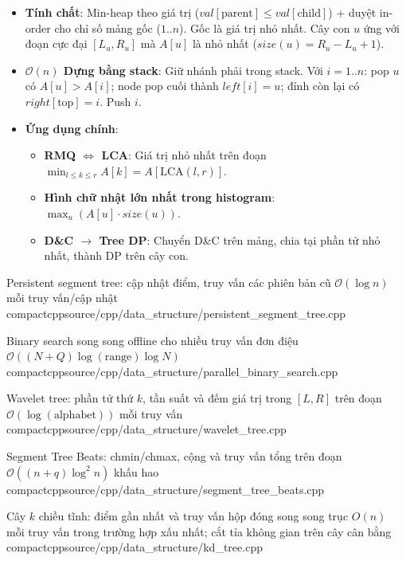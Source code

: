 \begin{itemize}
    \item \textbf{Tính chất}: Min-heap theo giá trị ($val[\text{parent}] \le val[\text{child}]$) + duyệt in-order cho chỉ số mảng gốc ($1..n$). Gốc là giá trị nhỏ nhất. Cây con $u$ ứng với đoạn cực đại $[L_u, R_u]$ mà $A[u]$ là nhỏ nhất ($size(u) = R_u - L_u + 1$).
    \item \textbf{$\mathcal{O}(n)$ Dựng bằng stack}: Giữ nhánh phải trong stack. Với $i = 1..n$: pop $u$ có $A[u] > A[i]$; node pop cuối thành $left[i] = u$; đỉnh còn lại có $right[\text{top}] = i$. Push $i$.
    \item \textbf{Ứng dụng chính}:
    \begin{itemize}
        \item \textbf{RMQ $\iff$ LCA}: Giá trị nhỏ nhất trên đoạn $\min_{l \le k \le r} A[k] = A[\text{LCA}(l, r)]$.
        \item \textbf{Hình chữ nhật lớn nhất trong histogram}: $\max_u (A[u] \cdot size(u))$.
        \item \textbf{D\&C $\to$ Tree DP}: Chuyển D\&C trên mảng, chia tại phần tử nhỏ nhất, thành DP trên cây con.
    \end{itemize}
\end{itemize}

{Persistent segment tree: cập nhật điểm, truy vấn các phiên bản cũ}
{$\mathcal{O}(\log n)$ mỗi truy vấn/cập nhật}
{compactcpp}{source/cpp/data_structure/persistent_segment_tree.cpp}

{Binary search song song offline cho nhiều truy vấn đơn điệu}
{$\mathcal{O}((N + Q) \log (\text{range}) \log N)$}
{compactcpp}{source/cpp/data_structure/parallel_binary_search.cpp}

{Wavelet tree: phần tử thứ $k$, tần suất và đếm giá trị trong $[L, R]$ trên đoạn}
{$\mathcal{O}(\log (\text{alphabet}))$ mỗi truy vấn}
{compactcpp}{source/cpp/data_structure/wavelet_tree.cpp}

{Segment Tree Beats: chmin/chmax, cộng và truy vấn tổng trên đoạn}
{$\mathcal{O}((n+q)\log^2 n)$ khấu hao}
{compactcpp}{source/cpp/data_structure/segment_tree_beats.cpp}

{Cây $k$ chiều tĩnh: điểm gần nhất và truy vấn hộp đóng song song trục}
{$O(n)$ mỗi truy vấn trong trường hợp xấu nhất; cắt tỉa không gian trên cây cân bằng}
{compactcpp}{source/cpp/data_structure/kd_tree.cpp}

